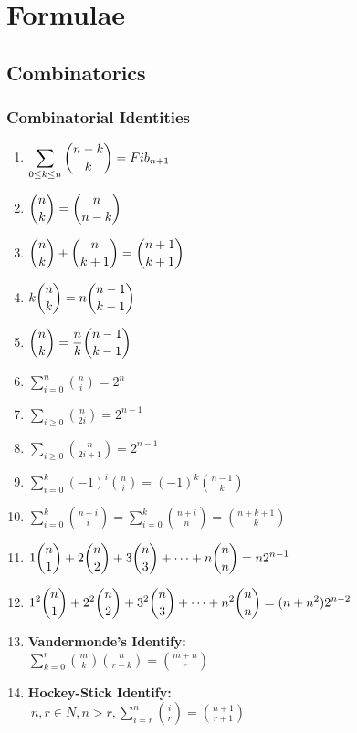 \chapter{Formulae}

\small

\section{Combinatorics}
\subsection{Combinatorial Identities}
\begin{enumerate}
    \item $\displaystyle \displaystyle \sum \limits_{0\leq k \leq n} {n-k \choose k} = Fib_{n+1}$
    \item $\displaystyle \displaystyle {n \choose k}={n \choose n-k}$
    \item $\displaystyle \displaystyle {n \choose k}+{n \choose k+1}={n+1 \choose k+1}$
    \item $\displaystyle \displaystyle k{n \choose k}=n{n-1 \choose k-1}$
    \item $\displaystyle \displaystyle {n \choose k}=\frac{n}{k}{n-1 \choose k-1}$
    \item $\displaystyle \sum \limits_{i=0}^n{n \choose i}=2^n$
    \item $\displaystyle \sum \limits_{i\geq 0}{n \choose 2i}=2^{n-1}$
    \item $\displaystyle \sum \limits_{i\geq 0}{n \choose 2i+1}=2^{n-1}$
    \item $\displaystyle \sum \limits_{i= 0}^k \left( -1 \right) ^i{n \choose i}=\left( -1 \right) ^k{n-1 \choose k}$
    \item $\displaystyle \sum \limits_{i= 0}^k{n+i \choose i}= \sum \limits_{i= 0}^k{n+i \choose n} = {n+k+1 \choose k}$
    \item $\displaystyle \displaystyle1{n \choose 1}+2{n \choose 2}+3{n \choose 3}+\dots+n{n \choose n}=n2^{n-1}$
    \item $\displaystyle \displaystyle1^2{n \choose 1}+2^2{n \choose 2}+3^2{n \choose 3}+\dots+n^2{n \choose n}=(n+n^2)2^{n-2}$
    \item \textbf{Vandermonde’s Identify:} \\ $\displaystyle \sum \limits_{k=0}^r{m \choose k}{n \choose r-k}={m+n \choose r}$
    \item \textbf{Hockey-Stick Identify:} \\ $\displaystyle \ n,r \in N, n > r, \sum \limits_{i=r}^n{i \choose r}={n+1 \choose r+1}$

\end{enumerate}
